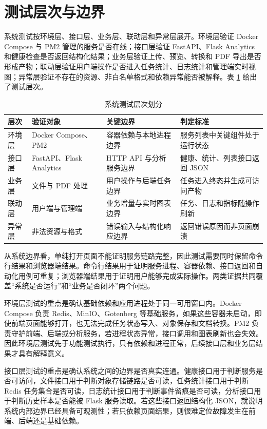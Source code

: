 \section{测试层次与边界}

系统测试按环境层、接口层、业务层、联动层和异常层展开。环境层验证 Docker Compose 与 PM2 管理的服务是否在线；接口层验证 FastAPI、Flask Analytics 和健康检查是否返回结构化结果；业务层验证上传、预览、转换和 PDF 导出是否形成产物；联动层验证用户端操作是否进入任务统计、日志统计和管理端实时视图；异常层验证不存在的资源、非白名单格式和依赖异常能否被解释。表 \ref{tab:chap06-test-levels} 给出了测试层次。

\begin{table}[H]
  \centering
  \caption{系统测试层次划分}
  \label{tab:chap06-test-levels}
  \begin{tabularx}{\textwidth}{llXX}
    \toprule
    层次 & 验证对象 & 关键边界 & 判定标准 \\
    \midrule
    环境层 & Docker Compose、PM2 & 容器依赖与本地进程边界 & 服务列表中关键组件处于运行状态 \\
    接口层 & FastAPI、Flask Analytics & HTTP API 与分析服务边界 & 健康、统计、列表接口返回 JSON \\
    业务层 & 文件与 PDF 处理 & 用户操作与后端任务边界 & 任务进入终态并生成可访问产物 \\
    联动层 & 用户端与管理端 & 业务增量与实时图表边界 & 任务、日志和指标随操作刷新 \\
    异常层 & 非法资源与格式 & 错误输入与结构化响应边界 & 返回错误原因而非页面崩溃 \\
    \bottomrule
  \end{tabularx}
\end{table}

从系统边界看，单纯打开页面不能证明服务链路完整，因此测试需要同时保留命令行结果和浏览器端结果。命令行结果用于证明服务进程、容器依赖、接口返回和自动化用例可重复；浏览器端结果用于证明用户能够完成实际操作。两类证据共同覆盖“系统是否运行”和“业务是否闭环”两个问题。

环境层测试的重点是确认基础依赖和应用进程处于同一可用窗口内。Docker Compose 负责 Redis、MinIO、Gotenberg 等基础服务，如果这些容器未启动，即使前端页面能够打开，也无法完成任务状态写入、对象保存和文档转换。PM2 负责守护前端、后端或分析服务，若进程状态异常，接口调用和图表刷新也会失效。因此环境层测试先于功能测试执行，只有依赖和进程正常，后续接口层和业务层结果才具有解释意义。

接口层测试的重点是确认系统之间的边界是否真实连通。健康接口用于判断服务是否可访问，文件接口用于判断对象存储链路是否可读，任务统计接口用于判断 Redis 任务集合是否可读，日志统计接口用于判断事件留痕是否可读，分析接口用于判断历史样本是否能被 Flask 服务读取。若这些接口返回结构化 JSON，就说明系统内部边界已经具备可观测性；若只依赖页面结果，则很难定位故障发生在前端、后端还是基础依赖。

